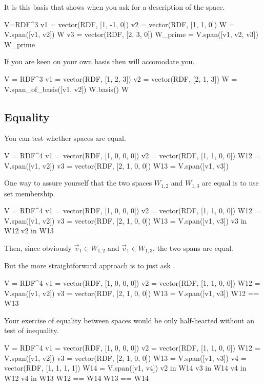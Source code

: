 It is this basis that \Sage{} shows when you ask for a description
of the space.
\begin{sageoutput}[d,0,3]
V=RDF^3               
v1 = vector(RDF, [1, -1, 0]) 
v2 = vector(RDF, [1, 1, 0]) 
W = V.span([v1, v2])       
W
v3 = vector(RDF, [2, 3, 0])
W_prime = V.span([v1, v2, v3])
W_prime
\end{sageoutput}

If you are keen on your own basis then \Sage{} will
accomodate you.
\begin{sageoutput}
V = RDF^3
v1 = vector(RDF, [1, 2, 3])
v2 = vector(RDF, [2, 1, 3])
W = V.span_of_basis([v1, v2])
W.basis()
W
\end{sageoutput}




\subsection{Equality}

You can test whether spaces are equal.
\begin{sageoutput}
V = RDF^4
v1 = vector(RDF, [1, 0, 0, 0])
v2 = vector(RDF, [1, 1, 0, 0])
W12 = V.span([v1, v2])
v3 = vector(RDF, [2, 1, 0, 0])
W13 = V.span([v1, v3])  
\end{sageoutput}
\noindent
One way to assure yourself that the two spaces $W_{1,2}$ and $W_{1,3}$ 
are equal is to use set membership.
\begin{sageoutput}[d,0,6]
V = RDF^4
v1 = vector(RDF, [1, 0, 0, 0])
v2 = vector(RDF, [1, 1, 0, 0])
W12 = V.span([v1, v2])
v3 = vector(RDF, [2, 1, 0, 0])
W13 = V.span([v1, v3])  
v3 in W12
v2 in W13
\end{sageoutput}
\noindent
Then, since obviously $\vec{v}_1\in W_{1,2}$ and $\vec{v}_1\in W_{1,3}$, the two
spans are equal.

But the more straightforward approach is to just ask \Sage{}.
\begin{sageoutput}[d,0,6]
V = RDF^4
v1 = vector(RDF, [1, 0, 0, 0])
v2 = vector(RDF, [1, 1, 0, 0])
W12 = V.span([v1, v2])
v3 = vector(RDF, [2, 1, 0, 0])
W13 = V.span([v1, v3])  
W12 == W13
\end{sageoutput}

Your exercise of \inlinecode{==} equality between spaces 
would be only half-hearted without an test of inequality. 
\begin{sageoutput}[d,0,6]
V = RDF^4
v1 = vector(RDF, [1, 0, 0, 0])
v2 = vector(RDF, [1, 1, 0, 0])
W12 = V.span([v1, v2])
v3 = vector(RDF, [2, 1, 0, 0])
W13 = V.span([v1, v3])  
v4 = vector(RDF, [1, 1, 1, 1])
W14 = V.span([v1, v4])
v2 in W14
v3 in W14                                 
v4 in W12
v4 in W13
W12 == W14                                                              
W13 == W14
\end{sageoutput}

